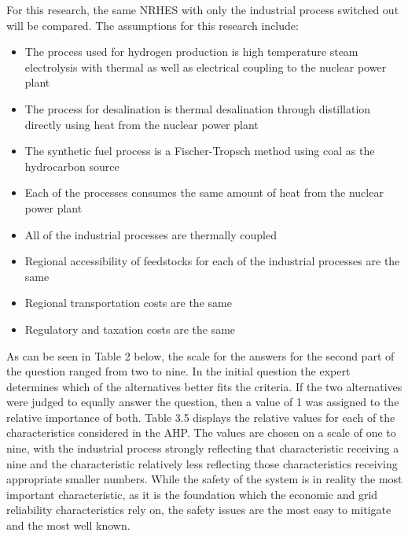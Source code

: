  For this research, the same NRHES with only the industrial process switched out will be compared. The assumptions for this research include:
\begin{itemize}
\item The process used for hydrogen production is high temperature steam electrolysis with thermal as well as electrical coupling to the nuclear power plant
\item  The process for desalination is thermal desalination through distillation directly using heat from the nuclear power plant
\item The synthetic fuel process is a Fischer-Tropsch method using coal as the hydrocarbon source
\item Each of the processes consumes the same amount of heat from the nuclear power plant
\item All of the industrial processes are thermally coupled
\item Regional accessibility of feedstocks for each of the industrial processes are the same
\item Regional transportation costs are the same
\item Regulatory and taxation costs are the same
\end{itemize}

As can be seen in Table 2 below, the scale for the answers for the second part of the question ranged from two to  nine.  In the initial question the expert determines which of the alternatives better fits the criteria.  If the two alternatives were judged to equally answer the question, then a value of 1 was assigned to the relative importance of both. Table 3.5 displays the relative values for each of the characteristics considered in the AHP. The values are chosen on a scale of one to nine, with the industrial process strongly reflecting that characteristic receiving a nine and the characteristic relatively less reflecting those characteristics receiving appropriate smaller numbers. While the safety of the system is in reality the most important characteristic, as it is the foundation which the economic and grid reliability characteristics rely on, the safety issues are the most easy to mitigate and the most well known.

